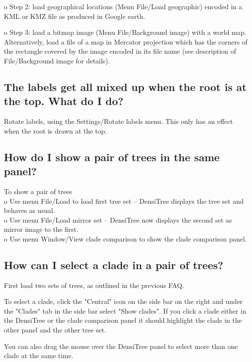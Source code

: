 \documentclass{article}
\begin{document}
\noindent o Step 2: load geographical locations (Menu File/Load geographic) encoded in a KML or KMZ file as
produced in Google earth.

\noindent o Step 3: load a bitmap image (Menu File/Background image) with a world map.
Alternatively, load a file of a map in Mercator projection which has the 
corners of the rectangle covered by the image encoded in its file name (see 
description of File/Background image for details).

\subsection{The labels get all mixed up when the root is at the top. What do I do?}
Rotate labels, using the Settings/Rotate labels menu. This only has an effect when the root
is drawn at the top.



\subsection{How do I show a pair of trees in the same panel?}

To show a pair of trees\\
o Use menu File/Load to load first tree set -- DensiTree displays the tree set and behaves as usual.\\
o Use menu File/Load mirror set -- DensiTree now displays the second set as mirror image to the first.\\
o Use menu Window/View clade comparison to show the clade comparison panel.\\


\subsection{How can I select a clade in a pair of trees?}

First load two sets of trees, as outlined in the previous FAQ.

To select a clade, click the "Central" icon on the side bar on the right and under the "Clades" tab in 
the side bar select "Show clades". If you click a clade either in the DensiTree or the clade comparison 
panel it should highlight the clade in the other panel and the other tree set.

You can also drag the mouse over the DensiTree panel to select more than one clade at the same time.

%
\end{document}
